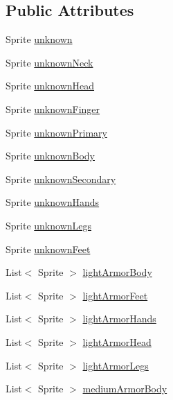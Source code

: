 \subsection*{Public Attributes}
\begin{DoxyCompactItemize}
\item 
Sprite \mbox{\hyperlink{class_item_sprites_a64e9d3883a260484cce4b5c3887aa58c}{unknown}}
\item 
Sprite \mbox{\hyperlink{class_item_sprites_ae998a241707a0954c0897fb15064bf7a}{unknown\+Neck}}
\item 
Sprite \mbox{\hyperlink{class_item_sprites_a69f91667aebb0441952acc7b22e2680b}{unknown\+Head}}
\item 
Sprite \mbox{\hyperlink{class_item_sprites_a4e032b4a23e261e05b74abb7de79c08e}{unknown\+Finger}}
\item 
Sprite \mbox{\hyperlink{class_item_sprites_a492900f0ec1e48269f947ad33c2edd8c}{unknown\+Primary}}
\item 
Sprite \mbox{\hyperlink{class_item_sprites_a1593dd2d6c6294269bef009e55f78c86}{unknown\+Body}}
\item 
Sprite \mbox{\hyperlink{class_item_sprites_a5ef9da17a7a9a1cdb3512af435693f15}{unknown\+Secondary}}
\item 
Sprite \mbox{\hyperlink{class_item_sprites_a486a4bd48f884fda6e69bf2cbf7f7f28}{unknown\+Hands}}
\item 
Sprite \mbox{\hyperlink{class_item_sprites_a67fccfa226dd5c1e6295ec6783be0688}{unknown\+Legs}}
\item 
Sprite \mbox{\hyperlink{class_item_sprites_ab39b9b1c46696ddbaf1ffeff7ee4e945}{unknown\+Feet}}
\item 
List$<$ Sprite $>$ \mbox{\hyperlink{class_item_sprites_aee2febc3fec994b0c7cf25a77cd7dc36}{light\+Armor\+Body}}
\item 
List$<$ Sprite $>$ \mbox{\hyperlink{class_item_sprites_a5ab90ba7ee1163f578f19bcb4aa90b5f}{light\+Armor\+Feet}}
\item 
List$<$ Sprite $>$ \mbox{\hyperlink{class_item_sprites_a4e06ca96512e96e68c2087811a770ad2}{light\+Armor\+Hands}}
\item 
List$<$ Sprite $>$ \mbox{\hyperlink{class_item_sprites_a8ebd65ff9425936892202e9112bb1887}{light\+Armor\+Head}}
\item 
List$<$ Sprite $>$ \mbox{\hyperlink{class_item_sprites_a456306becfba506b7560b25be43d97cf}{light\+Armor\+Legs}}
\item 
List$<$ Sprite $>$ \mbox{\hyperlink{class_item_sprites_a6384680172497096a3ec7a5b251c0d8d}{medium\+Armor\+Body}}

\end{DoxyCompactItemize}
